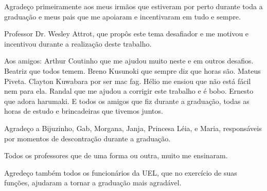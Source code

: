 \begin{agradecimentos}
Agradeço primeiramente aos meus irmãos que estiveram por perto durante toda
a graduação e meus pais que me apoiaram e incentivaram 
em tudo e sempre.
        
Professor Dr. Wesley Attrot, que propôs este tema desafiador e me motivou e 
incentivou durante a realização deste trabalho.

Aos amigos: 
Arthur Coutinho que me ajudou muito neste e em outros desafios. 
Beatriz que todos temem. 
Breno Kusunoki que sempre diz que horas são.
Mateus Piveta. 
Clayton Kuwabara por ser mac fag. 
Hélio me ensiou que não está fácil nem para ela. 
Randal que me ajudou a corrigir este trabalho e é bobo. 
Ernesto que adora harumaki.
E todos os amigos que fiz durante a graduação, todas as horas de estudo
e brincadeiras que tivemos juntos.

Agradeço a Bijuzinho, Gab, Morgana, Janja, Princesa Léia, e Maria, responsáveis
por momentos de descontração durante a graduação.

Todos os professores que de uma forma ou outra, muito me ensinaram.

Agredeço também todos os funcionários da UEL, que no exercício de suas funções,
ajudaram a tornar a graduação mais agradável.
\end{agradecimentos}
